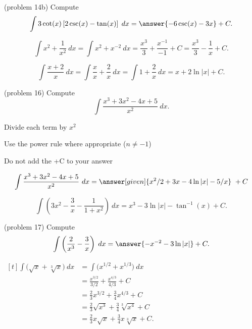 \documentclass{ximera}
\begin{document}
\begin{problem}(problem 14b)
Compute
\[
\int 3\cot(x)\left[2\csc(x) - \tan(x)\right]\; dx = \answer{-6\csc(x) - 3x} + C.
\]
\end{problem}



\begin{example}[example 15]
\[
\int x^2 + \dfrac{1}{x^2} \ dx = \int x^2 + x^{-2} \ dx = \dfrac{x^3}{3} + \dfrac{x^{-1}}{-1} + C 
= \dfrac{x^3}{3} - \dfrac{1}{x} + C.
\]

\end{example}


\begin{example}[example 16]
\[
\int \dfrac{x+2}{x} \ dx = \int \dfrac{x}{x} + \dfrac{2}{x} \ dx = \int 1 + \dfrac{2}{x} \ dx = x + 2\ln|x| +C.
\]

\end{example}


\begin{problem}(problem 16)
Compute
\[
\int \dfrac{x^3 + 3x^2 - 4x + 5}{x^2} \ dx.
\]

\begin{hint}
Divide each term by $x^2$
\end{hint}
\begin{hint}
Use the power rule where appropriate ($n\neq -1$)
\end{hint}
\begin{hint}
\begin{center}
Do not add the +C to your answer
\end{center}
\end{hint}

\[
\int  \dfrac{x^3 + 3x^2 - 4x + 5}{x^2} \ dx =
\answer[given]{x^2 /2 + 3x - 4\ln|x| -5/x} \ +  C
\]
\end{problem}



\begin{example}[example 17]
\[
\int \left(3x^2 - \dfrac{3}{x} - \dfrac{1}{1+x^2}\right) \ dx = x^3 - 3\ln|x| - \tan^{-1}(x) + C.
\]
\end{example}


\begin{problem}(problem 17)
Compute
\[
\int \left(\frac{2}{x^3} - \frac{3}{x} \right) \; dx = \answer{-x^{-2} -3\ln|x|} + C.
\]
\end{problem}

\begin{example}[example 18]
$\begin{aligned}[t]
\int \big(\sqrt x + \sqrt[3] x \big) \ dx &= \int \big(x^{1/2} + x^{1/3}\big) \ dx \\
&= \frac{x^{3/2}}{3/2} + \frac{x^{4/3}}{4/3} + C \\
&= \tfrac{2}{3} x^{3/2} + \tfrac{3}{4} x^{4/3} + C \\
&= \tfrac{2}{3} \sqrt {x^3} + \tfrac{3}{4}  \sqrt[3] {x^4} + C \\
&= \tfrac{2}{3} x\sqrt x + \tfrac{3}{4} x \sqrt[3] x + C.
\end{aligned}$
\end{example}
\end{document}

